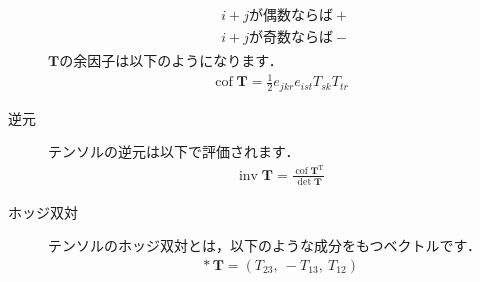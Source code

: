 \begin{description}
            \begin{align}
             \label{eq:1.37}
             \begin{aligned}
              &\text{$i + j$が偶数ならば$+$} \\
              &\text{$i + j$が奇数ならば$-$}
             \end{aligned}
            \end{align}
            $\bm{T}$の余因子は以下のようになります．
            \begin{align}
             \label{eq:1.38}
             \mathop{\mathrm{cof}}\bm{T} = \frac{1}{2}e_{jkr}e_{ist}T_{sk}T_{tr}
            \end{align}
 \item[逆元] テンソルの逆元は以下で評価されます．
            \begin{align}
             \label{eq:1.39}
             \mathop{\mathrm{inv}}\bm{T}
             = \frac{\mathop{\mathrm{cof}}\bm{T}^{\mathrm{T}}}{\det\bm{T}}
            \end{align}
 \item[ホッジ双対] テンソルのホッジ双対とは，以下のような成分をもつベクトルです．
            \begin{align}
             \label{eq:1.40}
             \mathop{*}\bm{T} = (T_{23},\ -T_{13},\ T_{12})
            \end{align}
\end{description}


